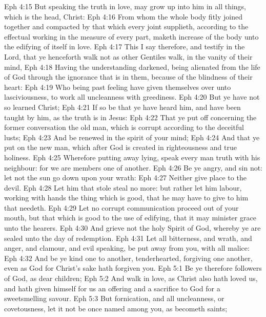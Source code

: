 \vs Eph 4:15 But speaking the truth in love, may grow up into him in all things, which is the head,  Christ:
\vs Eph 4:16 From whom the whole body fitly joined together and compacted by that which every joint supplieth, according to the effectual working in the measure of every part, maketh increase of the body unto the edifying of itself in love.
\vs Eph 4:17 This I say therefore, and testify in the Lord, that ye henceforth walk not as other Gentiles walk, in the vanity of their mind,
\vs Eph 4:18 Having the understanding darkened, being alienated from the life of God through the ignorance that is in them, because of the blindness of their heart:
\vs Eph 4:19 Who being past feeling have given themselves over unto lasciviousness, to work all uncleanness with greediness.
\vs Eph 4:20 But ye have not so learned Christ;
\vs Eph 4:21 If so be that ye have heard him, and have been taught by him, as the truth is in Jesus:
\vs Eph 4:22 That ye put off concerning the former conversation the old man, which is corrupt according to the deceitful lusts;
\vs Eph 4:23 And be renewed in the spirit of your mind;
\vs Eph 4:24 And that ye put on the new man, which after God is created in righteousness and true holiness.
\vs Eph 4:25 Wherefore putting away lying, speak every man truth with his neighbour: for we are members one of another.
\vs Eph 4:26 Be ye angry, and sin not: let not the sun go down upon your wrath:
\vs Eph 4:27 Neither give place to the devil.
\vs Eph 4:28 Let him that stole steal no more: but rather let him labour, working with  hands the thing which is good, that he may have to give to him that needeth.
\vs Eph 4:29 Let no corrupt communication proceed out of your mouth, but that which is good to the use of edifying, that it may minister grace unto the hearers.
\vs Eph 4:30 And grieve not the holy Spirit of God, whereby ye are sealed unto the day of redemption.
\vs Eph 4:31 Let all bitterness, and wrath, and anger, and clamour, and evil speaking, be put away from you, with all malice:
\vs Eph 4:32 And be ye kind one to another, tenderhearted, forgiving one another, even as God for Christ's sake hath forgiven you.
\vs Eph 5:1 Be ye therefore followers of God, as dear children;
\vs Eph 5:2 And walk in love, as Christ also hath loved us, and hath given himself for us an offering and a sacrifice to God for a sweetsmelling savour.
\vs Eph 5:3 But fornication, and all uncleanness, or covetousness, let it not be once named among you, as becometh saints;
